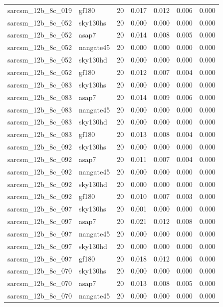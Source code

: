 \begin{tabular}{llrrrrr}
sarcsm\_12b\_8c\_019 & gf180 & 20 & 0.017 & 0.012 & 0.006 & 0.000 \\
sarcsm\_12b\_8c\_052 & sky130hs & 20 & 0.000 & 0.000 & 0.000 & 0.000 \\
sarcsm\_12b\_8c\_052 & asap7 & 20 & 0.014 & 0.008 & 0.005 & 0.000 \\
sarcsm\_12b\_8c\_052 & nangate45 & 20 & 0.000 & 0.000 & 0.000 & 0.000 \\
sarcsm\_12b\_8c\_052 & sky130hd & 20 & 0.000 & 0.000 & 0.000 & 0.000 \\
sarcsm\_12b\_8c\_052 & gf180 & 20 & 0.012 & 0.007 & 0.004 & 0.000 \\
sarcsm\_12b\_8c\_083 & sky130hs & 20 & 0.000 & 0.000 & 0.000 & 0.000 \\
sarcsm\_12b\_8c\_083 & asap7 & 20 & 0.014 & 0.009 & 0.006 & 0.000 \\
sarcsm\_12b\_8c\_083 & nangate45 & 20 & 0.000 & 0.000 & 0.000 & 0.000 \\
sarcsm\_12b\_8c\_083 & sky130hd & 20 & 0.000 & 0.000 & 0.000 & 0.000 \\
sarcsm\_12b\_8c\_083 & gf180 & 20 & 0.013 & 0.008 & 0.004 & 0.000 \\
sarcsm\_12b\_8c\_092 & sky130hs & 20 & 0.000 & 0.000 & 0.000 & 0.000 \\
sarcsm\_12b\_8c\_092 & asap7 & 20 & 0.011 & 0.007 & 0.004 & 0.000 \\
sarcsm\_12b\_8c\_092 & nangate45 & 20 & 0.000 & 0.000 & 0.000 & 0.000 \\
sarcsm\_12b\_8c\_092 & sky130hd & 20 & 0.000 & 0.000 & 0.000 & 0.000 \\
sarcsm\_12b\_8c\_092 & gf180 & 20 & 0.010 & 0.007 & 0.003 & 0.000 \\
sarcsm\_12b\_8c\_097 & sky130hs & 20 & 0.001 & 0.000 & 0.000 & 0.000 \\
sarcsm\_12b\_8c\_097 & asap7 & 20 & 0.021 & 0.012 & 0.008 & 0.000 \\
sarcsm\_12b\_8c\_097 & nangate45 & 20 & 0.000 & 0.000 & 0.000 & 0.000 \\
sarcsm\_12b\_8c\_097 & sky130hd & 20 & 0.000 & 0.000 & 0.000 & 0.000 \\
sarcsm\_12b\_8c\_097 & gf180 & 20 & 0.018 & 0.012 & 0.006 & 0.000 \\
sarcsm\_12b\_8c\_070 & sky130hs & 20 & 0.000 & 0.000 & 0.000 & 0.000 \\
sarcsm\_12b\_8c\_070 & asap7 & 20 & 0.013 & 0.008 & 0.005 & 0.000 \\
sarcsm\_12b\_8c\_070 & nangate45 & 20 & 0.000 & 0.000 & 0.000 & 0.000 \\

\end{tabular}
